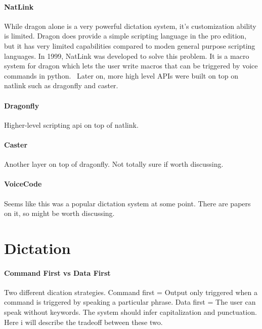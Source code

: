 \documentclass[a4paper,english]{ifimaster}
\begin{document}
\paragraph{NatLink}
While dragon alone is a very powerful dictation system, it's customization ability is limited.
Dragon does provide a simple scripting language in the pro edition, but it has very limited capabilities compared to
moden general purpose scripting languages.
In 1999, NatLink was developed to solve this problem. It is a macro system for dragon which lets the user write macros that can be triggered by voice commands
in python.~\parencite{gould2001implementation}
Later on, more high level APIs were built on top on natlink such as dragonfly and caster. %

\paragraph{Dragonfly}
Higher-level scripting api on top of natlink.

\paragraph{Caster}
Another layer on top of dragonfly. Not totally sure if worth discussing.

\paragraph{VoiceCode}
Seems like this was a popular dictation system at some point. There are papers on it, so might be worth discussing.

\section{Dictation}
\paragraph{Command First vs Data First}
Two different dication strategies.
Command first = Output only triggered when a command is triggered by speaking a particular phrase.
Data first = The user can speak without keywords. The system should infer capitalization and punctuation.
Here i will describe the tradeoff between these two.
\end{document}
